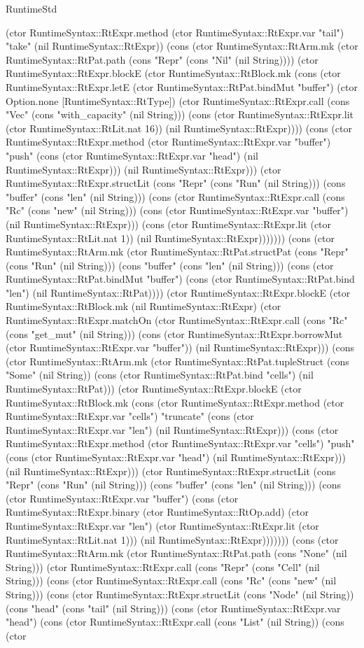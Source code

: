 \begin{lexlean}{RuntimeStd}
\begin{semanticmodule}
{(ctor RuntimeSyntax::RtExpr.method (ctor RuntimeSyntax::RtExpr.var "tail") "take" (nil RuntimeSyntax::RtExpr)) (cons (ctor RuntimeSyntax::RtArm.mk (ctor RuntimeSyntax::RtPat.path (cons "Repr" (cons "Nil" (nil String)))) (ctor RuntimeSyntax::RtExpr.blockE (ctor RuntimeSyntax::RtBlock.mk (cons (ctor RuntimeSyntax::RtExpr.letE (ctor RuntimeSyntax::RtPat.bindMut "buffer") (ctor Option.none [RuntimeSyntax::RtType]) (ctor RuntimeSyntax::RtExpr.call (cons "Vec" (cons "with_capacity" (nil String))) (cons (ctor RuntimeSyntax::RtExpr.lit (ctor RuntimeSyntax::RtLit.nat 16)) (nil RuntimeSyntax::RtExpr)))) (cons (ctor RuntimeSyntax::RtExpr.method (ctor RuntimeSyntax::RtExpr.var "buffer") "push" (cons (ctor RuntimeSyntax::RtExpr.var "head") (nil RuntimeSyntax::RtExpr))) (nil RuntimeSyntax::RtExpr))) (ctor RuntimeSyntax::RtExpr.structLit (cons "Repr" (cons "Run" (nil String))) (cons "buffer" (cons "len" (nil String))) (cons (ctor RuntimeSyntax::RtExpr.call (cons "Rc" (cons "new" (nil String))) (cons (ctor RuntimeSyntax::RtExpr.var "buffer") (nil RuntimeSyntax::RtExpr))) (cons (ctor RuntimeSyntax::RtExpr.lit (ctor RuntimeSyntax::RtLit.nat 1)) (nil RuntimeSyntax::RtExpr))))))) (cons (ctor RuntimeSyntax::RtArm.mk (ctor RuntimeSyntax::RtPat.structPat (cons "Repr" (cons "Run" (nil String))) (cons "buffer" (cons "len" (nil String))) (cons (ctor RuntimeSyntax::RtPat.bindMut "buffer") (cons (ctor RuntimeSyntax::RtPat.bind "len") (nil RuntimeSyntax::RtPat)))) (ctor RuntimeSyntax::RtExpr.blockE (ctor RuntimeSyntax::RtBlock.mk (nil RuntimeSyntax::RtExpr) (ctor RuntimeSyntax::RtExpr.matchOn (ctor RuntimeSyntax::RtExpr.call (cons "Rc" (cons "get_mut" (nil String))) (cons (ctor RuntimeSyntax::RtExpr.borrowMut (ctor RuntimeSyntax::RtExpr.var "buffer")) (nil RuntimeSyntax::RtExpr))) (cons (ctor RuntimeSyntax::RtArm.mk (ctor RuntimeSyntax::RtPat.tupleStruct (cons "Some" (nil String)) (cons (ctor RuntimeSyntax::RtPat.bind "cells") (nil RuntimeSyntax::RtPat))) (ctor RuntimeSyntax::RtExpr.blockE (ctor RuntimeSyntax::RtBlock.mk (cons (ctor RuntimeSyntax::RtExpr.method (ctor RuntimeSyntax::RtExpr.var "cells") "truncate" (cons (ctor RuntimeSyntax::RtExpr.var "len") (nil RuntimeSyntax::RtExpr))) (cons (ctor RuntimeSyntax::RtExpr.method (ctor RuntimeSyntax::RtExpr.var "cells") "push" (cons (ctor RuntimeSyntax::RtExpr.var "head") (nil RuntimeSyntax::RtExpr))) (nil RuntimeSyntax::RtExpr))) (ctor RuntimeSyntax::RtExpr.structLit (cons "Repr" (cons "Run" (nil String))) (cons "buffer" (cons "len" (nil String))) (cons (ctor RuntimeSyntax::RtExpr.var "buffer") (cons (ctor RuntimeSyntax::RtExpr.binary (ctor RuntimeSyntax::RtOp.add) (ctor RuntimeSyntax::RtExpr.var "len") (ctor RuntimeSyntax::RtExpr.lit (ctor RuntimeSyntax::RtLit.nat 1))) (nil RuntimeSyntax::RtExpr))))))) (cons (ctor RuntimeSyntax::RtArm.mk (ctor RuntimeSyntax::RtPat.path (cons "None" (nil String))) (ctor RuntimeSyntax::RtExpr.call (cons "Repr" (cons "Cell" (nil String))) (cons (ctor RuntimeSyntax::RtExpr.call (cons "Rc" (cons "new" (nil String))) (cons (ctor RuntimeSyntax::RtExpr.structLit (cons "Node" (nil String)) (cons "head" (cons "tail" (nil String))) (cons (ctor RuntimeSyntax::RtExpr.var "head") (cons (ctor RuntimeSyntax::RtExpr.call (cons "List" (nil String)) (cons (ctor }
\end{semanticmodule}
\end{lexlean}
